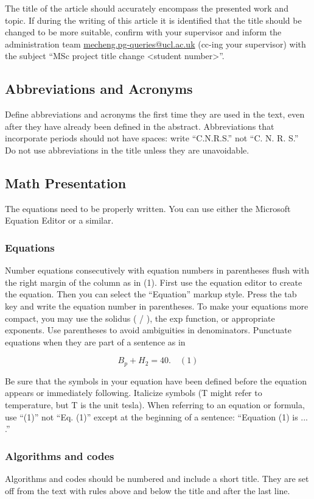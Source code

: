 \documentclass[11pt,a4paper]{article}
\begin{document}
The title of the article should accurately encompass the presented work and topic. If during the writing of this article it is identified that the title should be changed to be more suitable, confirm with your supervisor and inform the administration team \href{mailto:mecheng.pg-queries@ucl.ac.uk}{mecheng.pg-queries@ucl.ac.uk} (cc-ing your supervisor) with the subject “MSc project title change <student number>”.

\subsection{Abbreviations and Acronyms}
Define abbreviations and acronyms the first time they are used in the text, even after they have already been defined in the abstract. Abbreviations that incorporate periods should not have spaces: write “C.N.R.S.” not “C. N. R. S.” Do not use abbreviations in the title unless they are unavoidable.

\subsection{Math Presentation}
The equations need to be properly written. You can use either the Microsoft Equation Editor or a similar.
\subsubsection{Equations}
Number equations consecutively with equation numbers in parentheses flush with the right margin of the column as in (1). First use the equation editor to create the equation. Then you can select the “Equation” markup style. Press the tab key and write the equation number in parentheses. To make your equations more compact, you may use the solidus ( / ), the exp function, or appropriate exponents. Use parentheses to avoid ambiguities in denominators. Punctuate equations when they are part of a sentence as in

\begin{equation}
B_p + H_2 = 40. \quad (1)
\end{equation}

Be sure that the symbols in your equation have been defined before the equation appears or immediately following. Italicize symbols (T might refer to temperature, but T is the unit tesla). When referring to an equation or formula, use “(1)” not “Eq. (1)” except at the beginning of a sentence: “Equation (1) is ... .”

\subsubsection{Algorithms and codes}
Algorithms and codes should be numbered and include a short title. They are set off from the text with rules above and below the title and after the last line.
\end{document}
